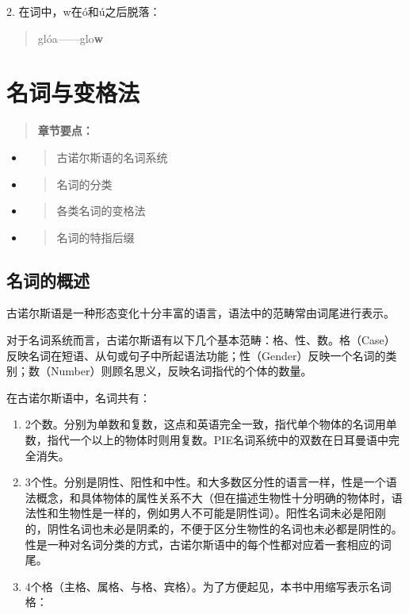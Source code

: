 2. 在词中，w在ó和ú之后脱落：

\begin{quote}
glóa------glo\textbf{w}
\end{quote}

\section{名词与变格法}\label{ux540dux8bcdux4e0eux53d8ux683cux6cd5}

\begin{quote}
\textbf{章节要点：}
\end{quote}

\begin{itemize}
\item
  \begin{quote}
  古诺尔斯语的名词系统
  \end{quote}
\item
  \begin{quote}
  名词的分类
  \end{quote}
\item
  \begin{quote}
  各类名词的变格法
  \end{quote}
\item
  \begin{quote}
  名词的特指后缀
  \end{quote}
\end{itemize}

\subsection{名词的概述}\label{ux540dux8bcdux7684ux6982ux8ff0}

古诺尔斯语是一种形态变化十分丰富的语言，语法中的范畴常由词尾进行表示。

对于名词系统而言，古诺尔斯语有以下几个基本范畴：格、性、数。格（Case）反映名词在短语、从句或句子中所起语法功能；性（Gender）反映一个名词的类别；数（Number）则顾名思义，反映名词指代的个体的数量。

在古诺尔斯语中，名词共有：

\begin{enumerate}
\def\labelenumi{\arabic{enumi})}
\item
  2个数。分别为单数和复数，这点和英语完全一致，指代单个物体的名词用单数，指代一个以上的物体时则用复数。PIE名词系统中的双数在日耳曼语中完全消失。
\item
  3个性。分别是阴性、阳性和中性。和大多数区分性的语言一样，性是一个语法概念，和具体物体的属性关系不大（但在描述生物性十分明确的物体时，语法性和生物性是一样的，例如男人不可能是阴性词）。阳性名词未必是阳刚的，阴性名词也未必是阴柔的，不便于区分生物性的名词也未必都是阴性的。性是一种对名词分类的方式，古诺尔斯语中的每个性都对应着一套相应的词尾。
\item
  4个格（主格、属格、与格、宾格）。为了方便起见，本书中用缩写表示名词格：
\end{enumerate}

